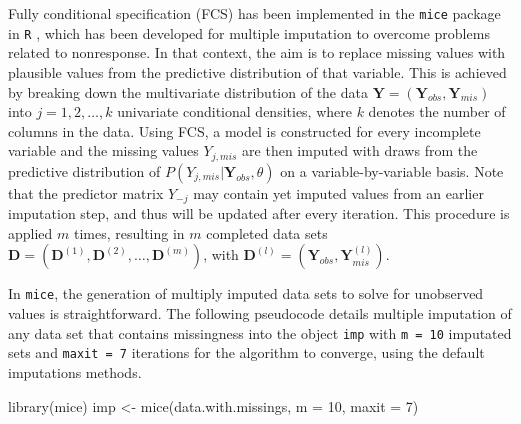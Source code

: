 \documentclass[psych,article,submit,moreauthors,pdftex]{mdpi}
\newenvironment{Shaded}{\begin{snugshade}}{\end{snugshade}}
\newcommand{\AttributeTok}[1]{\textcolor[rgb]{0.77,0.63,0.00}{#1}}
\newcommand{\DecValTok}[1]{\textcolor[rgb]{0.00,0.00,0.81}{#1}}
\newcommand{\FunctionTok}[1]{\textcolor[rgb]{0.00,0.00,0.00}{#1}}
\newcommand{\NormalTok}[1]{#1}
\newcommand{\OtherTok}[1]{\textcolor[rgb]{0.56,0.35,0.01}{#1}}
\begin{document}
Fully conditional specification (FCS) has been implemented in the
\texttt{mice} package \citep{mice, vanbuuren_fully_2006} in \texttt{R}
\citep{Rproject}, which has been developed for multiple imputation to
overcome problems related to nonresponse. In that context, the aim is to
replace missing values with plausible values from the predictive
distribution of that variable. This is achieved by breaking down the
multivariate distribution of the data
\(\textbf{Y} = (\textbf{Y}_{obs}, \textbf{Y}_{mis})\) into
\(j = 1, 2, \dots, k\) univariate conditional densities, where \(k\)
denotes the number of columns in the data. Using FCS, a model is
constructed for every incomplete variable and the missing values
\(Y_{j, mis}\) are then imputed with draws from the predictive
distribution of \(P(Y_{j, mis} | \textbf{Y}_{obs}, \theta)\) on a
variable-by-variable basis. Note that the predictor matrix \(Y_{-j}\)
may contain yet imputed values from an earlier imputation step, and thus
will be updated after every iteration. This procedure is applied \(m\)
times, resulting in \(m\) completed data sets
\(\textbf{D} = (\textbf{D}^{(1)}, \textbf{D}^{(2)}, \dots, \textbf{D}^{(m)})\),
with \(\textbf{D}^{(l)} = (\textbf{Y}_{obs}, \textbf{Y}^{(l)}_{mis})\).

In \texttt{mice}, the generation of multiply imputed data sets to solve
for unobserved values is straightforward. The following pseudocode
details multiple imputation of any data set that contains missingness
into the object \texttt{imp} with \texttt{m\ =\ 10} imputated sets and
\texttt{maxit\ =\ 7} iterations for the algorithm to converge, using the
default imputations methods.

\begin{Shaded}
\begin{Highlighting}[]
\FunctionTok{library}\NormalTok{(mice)}
\NormalTok{imp }\OtherTok{\textless{}{-}} \FunctionTok{mice}\NormalTok{(data.with.missings, }
            \AttributeTok{m =} \DecValTok{10}\NormalTok{,}
            \AttributeTok{maxit =} \DecValTok{7}\NormalTok{)}
\end{Highlighting}
\end{Shaded}
\end{document}
